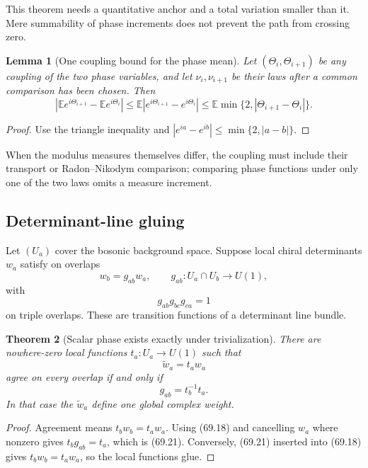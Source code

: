 \documentclass[11pt]{article}
\newtheorem{theorem}{Theorem}[section]
\newtheorem{lemma}[theorem]{Lemma}
\begin{document}
This theorem needs a quantitative anchor and a total variation smaller
than it.  Mere summability of phase increments does not prevent the
path from crossing zero.

\begin{lemma}[One coupling bound for the phase mean]
\label{lem:v11v69-coupling}
Let \((\Theta_i,\Theta_{i+1})\) be any coupling of the two phase
variables, and let \(\nu_i,\nu_{i+1}\) be their laws after a common
comparison has been chosen.  Then
\[
 |{\mathbb E}e^{i\Theta_{i+1}}
       -{\mathbb E}e^{i\Theta_i}|
 \le{\mathbb E}|e^{i\Theta_{i+1}}-e^{i\Theta_i}|
 \le{\mathbb E}\min\{2,|\Theta_{i+1}-\Theta_i|\}.             \tag{69.17}
\]
\end{lemma}

\begin{proof}
Use the triangle inequality and
\(|e^{ia}-e^{ib}|\le\min\{2,|a-b|\}\).
\end{proof}

When the modulus measures themselves differ, the coupling must include
their transport or Radon--Nikodym comparison; comparing phase functions
under only one of the two laws omits a measure increment.

\subsection{Determinant-line gluing}

Let \((U_a)\) cover the bosonic background space.  Suppose local
chiral determinants \(w_a\) satisfy on overlaps
\[
                              w_b=g_{ab}w_a,\qquad
                              g_{ab}:U_a\cap U_b\to U(1),      \tag{69.18}
\]
with
\[
                              g_{ab}g_{bc}g_{ca}=1            \tag{69.19}
\]
on triple overlaps.  These are transition functions of a determinant
line bundle.

\begin{theorem}[Scalar phase exists exactly under trivialization]
\label{thm:v11v69-trivial}
There are nowhere-zero local functions \(t_a:U_a\to U(1)\) such that
\[
                              \widetilde w_a=t_aw_a            \tag{69.20}
\]
agree on every overlap if and only if
\[
                              g_{ab}=t_b^{-1}t_a.              \tag{69.21}
\]
In that case the \(\widetilde w_a\) define one global complex weight.
\end{theorem}

\begin{proof}
Agreement means
\(t_bw_b=t_aw_a\).  Using (69.18) and cancelling \(w_a\) where
nonzero gives \(t_bg_{ab}=t_a\), which is (69.21).  Conversely,
(69.21) inserted into (69.18) gives
\(t_bw_b=t_aw_a\), so the local functions glue.
\end{proof}
\end{document}
